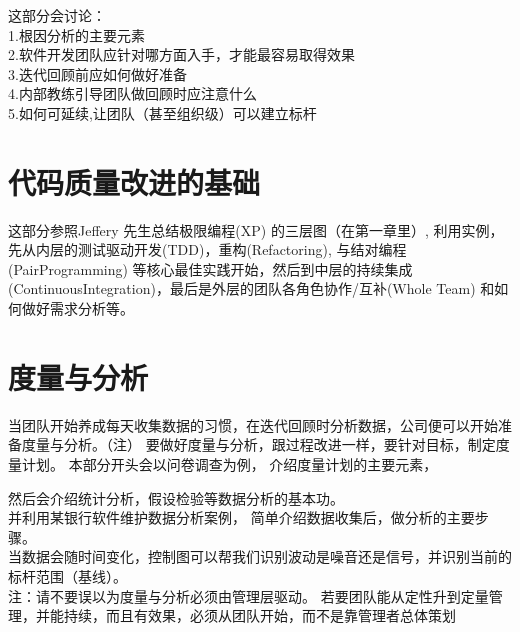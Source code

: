 \documentclass{book}        %
\begin{document}
这部分会讨论： \\

1.根因分析的主要元素\\
2.软件开发团队应针对哪方面入手，才能最容易取得效果\\
3.迭代回顾前应如何做好准备\\
4.内部教练引导团队做回顾时应注意什么\\
5.如何可延续,让团队（甚至组织级）可以建立标杆\\





\part{代码质量改进的基础}这部分参照Jeffery 先生总结极限编程(XP) 的三层图（在第一章里）, 利用实例，先从内层的测试驱动开发(TDD)，重构(Refactoring), 与结对编程(PairProgramming) 等核心最佳实践开始，然后到中层的持续集成(ContinuousIntegration)，最后是外层的团队各角色协作/互补(Whole Team) 和如何做好需求分析等。















\part{度量与分析}当团队开始养成每天收集数据的习惯，在迭代回顾时分析数据，公司便可以开始准备度量与分析。（注） 要做好度量与分析，跟过程改进一样，要针对目标，制定度量计划。 本部分开头会以问卷调查为例， 介绍度量计划的主要元素，

然后会介绍统计分析，假设检验等数据分析的基本功。\\

并利用某银行软件维护数据分析案例， 简单介绍数据收集后，做分析的主要步骤。\\

当数据会随时间变化，控制图可以帮我们识别波动是噪音还是信号，并识别当前的标杆范围（基线）。\\

注：请不要误以为度量与分析必须由管理层驱动。 若要团队能从定性升到定量管理，并能持续，而且有效果，必须从团队开始，而不是靠管理者总体策划 \\
\end{document}
